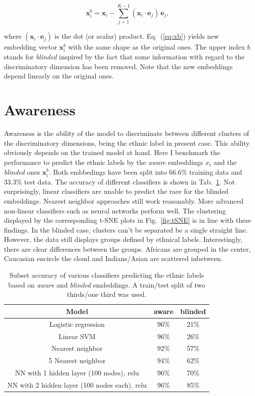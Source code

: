 \documentclass{report}
\begin{document}
\begin{equation}
\label{eq:xb}
	\bm{x}_i^{b} = \bm{x}_i - \sum_{j=1}^{K-1} (\bm{x}_i\cdot \bm{e}_j)\,\bm{e}_j,
\end{equation} 

\noindent where $(\bm{x}_i\cdot \bm{e}_j)$ is the dot (or scalar) product.  Eq.~(\ref{eq:xb}) yields new embedding vector $\bm{x}_i^{b}$ with the same shape as the original ones. The upper index $b$ stands for \emph{blinded} inspired by the fact that some information with regard to the discriminatory dimension has been removed. Note that the new embeddings depend linearly on the original ones. 
   

\section{Awareness}

Awareness is the ability of the model to discriminate between different clusters of the discriminatory dimensions, being the ethnic label in present case. This ability obviously depends on the trained model at hand. Here I benchmark the performance to predict the ethnic labels by the \emph{aware} embeddings $x_i$ and the \emph{blinded} ones $\bm{x}_i^{b}$. Both embbedings have been split into 66.6\% training data and 33.3\% test data. The accuracy of different classifiers is shown in Tab.~\ref{tab:awareness}. Not surprisingly, linear classifiers are unable to predict the race for the blinded embeddings. Nearest neighbor approaches still work reasonably. More advanced non-linear classifiers such as neural networks perform well. The clustering displayed by the corresponding t-SNE plots in Fig.~\ref{fig:tSNE} is in line with these findings. In the blinded case, clusters can't be separated be a single straight line. However, the data still displays groups defined by ethnical labels. Interestingly, there are clear differences between the groups. Africans are grouped in the center, Caucasian encircle the cloud and Indians/Asian are scattered inbetween. 

\begin{table}
\begin{center}
\begin{tabular}{ c|c|c  }
Model & aware  & blinded  \\
\hline
Logistic regression & 96\% & 21\% \\ 
Linear SVM & 96\% & 26\% \\  
Nearest neighbor & 92\% &  57\%  \\   
5 Nearest neighbor & 94\% &  62\%  \\   
NN with 1 hidden layer (100 nodes), relu  & 96\% &  70\%  \\   
NN with 2 hidden layer (100 nodes each), relu  & 96\% &  85\%    
\end{tabular}
\end{center}
\caption{Subset accuracy of various classifiers predicting the ethnic labels based on \emph{aware}  and \emph{blinded} emdeddings. A train/test split of two thirds/one third was used.}
\label{tab:awareness}
\end{table}
\end{document}
